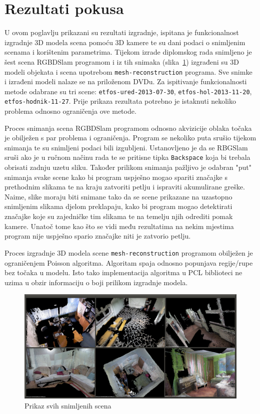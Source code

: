 \newpage
\setcounter{figure}{0}

\section{Rezultati pokusa} %
\label{sec:Rezultati}

U ovom poglavlju prikazani su rezultati izgradnje, ispitana je
funkcionalnost izgradnje 3D modela scena pomoću 3D kamere te su dani
podaci o snimljenim scenama i korištenim parametrima. Tijekom izrade
diplomskog rada snimljeno je šest scena RGBDSlam programom i iz tih
snimaka (slika~\ref{fig:01-all.png}) izgrađeni su 3D modeli objekata i
scena upotrebom \texttt{mesh-reconstruction} programa.  Sve snimke i
izrađeni modeli nalaze se na priloženom DVDu.  Za ispitivanje
funkcionalnosti metode odabrane su tri scene:
\texttt{etfos-ured-2013-07-30}, \texttt{etfos-hol-2013-11-20},
\texttt{etfos-hodnik-11-27}. Prije prikaza rezultata potrebno je
istaknuti nekoliko problema odnosno ograničenja ove metode.

Proces snimanja scena RGBDSlam programom odnosno akvizicije oblaka
točaka je obilježen s par problema i ograničenja. Program se nekoliko
puta srušio tijekom snimanja te su snimljeni podaci bili izgubljeni.
Ustanovljeno je da se RBGSlam sruši ako je u ručnom načinu rada te se
pritisne tipka \texttt{Backspace} koja bi trebala obrisati zadnju uzetu
sliku. Također prilikom snimanja pažljivo je odabran "put" snimanja
svake scene kako bi program uspješno mogao spariti značajke s prethodnim
slikama te na kraju zatvoriti petlju i ispraviti akumulirane greške.
Naime, slike moraju biti snimane tako da se scene prikazane na uzastopno
snimljenim slikama djelom preklapaju, kako bi program mogao detektirati
značajke koje su zajedničke tim slikama te na temelju njih odrediti
pomak kamere. Unatoč tome kao što se vidi među rezultatima na nekim
mjestima program nije uspješno spario značajke niti je zatvorio petlju.

Proces izgradnje 3D modela scene \texttt{mesh-reconstruction} programom
obilježen je ograničenjem Poisson algoritma. Algoritam spaja odnosno
popunjava regije/rupe bez točaka u modelu. Isto tako implementacija
algoritma u PCL biblioteci ne uzima u obzir informaciju o boji prilikom
izgradnje modela.

\begin{figure}[h]
\centering
\includegraphics[scale=0.19]{figures/01-all-pcd.png}
\caption{Prikaz svih snimljenih scena}
\label{fig:01-all.png}
\end{figure}

